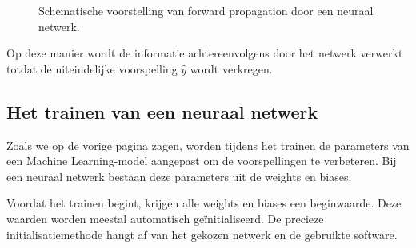 \documentclass{ximera}
\begin{document}
\begin{figure}[ht]
\centering


\caption{Schematische voorstelling van forward propagation door een neuraal
netwerk.}
\label{fig:forward_propagation}
\end{figure}

Op deze manier wordt de informatie achtereenvolgens door het netwerk verwerkt totdat de uiteindelijke voorspelling $\hat{y}$ wordt verkregen.

\subsection*{Het trainen van een neuraal netwerk}

Zoals we op de vorige pagina zagen, worden tijdens het trainen de parameters van een Machine Learning-model aangepast om de voorspellingen te verbeteren. Bij een neuraal netwerk bestaan deze parameters uit de
weights en biases.

Voordat het trainen begint, krijgen alle weights en biases een beginwaarde. Deze waarden worden meestal automatisch
geïnitialiseerd. De precieze initialisatiemethode hangt af van het gekozen
netwerk en de gebruikte software. 
\end{document}
